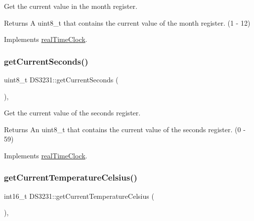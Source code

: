 Get the current value in the month register. 

\begin{DoxyReturn}{Returns}
A uint8\+\_\+t that contains the current value of the month register. (1 -\/ 12) 
\end{DoxyReturn}


Implements \mbox{\hyperlink{classreal_time_clock_a24dd15babb345129fd995641946c5f2b}{real\+Time\+Clock}}.

\mbox{\label{class_d_s3231_a8a5357eae07991d94f8f7610a3f3073a}} 
\subsubsection{\texorpdfstring{get\+Current\+Seconds()}{getCurrentSeconds()}}
{\footnotesize\ttfamily uint8\+\_\+t D\+S3231\+::get\+Current\+Seconds (\begin{DoxyParamCaption}{ }\end{DoxyParamCaption})\hspace{0.3cm}{\ttfamily [override]}, {\ttfamily [virtual]}}



Get the current value of the seconds register. 

\begin{DoxyReturn}{Returns}
An uint8\+\_\+t that contains the current value of the seconds register. (0 -\/ 59) 
\end{DoxyReturn}


Implements \mbox{\hyperlink{classreal_time_clock_a46bfe69dc650cc27e648ac7adb03afd0}{real\+Time\+Clock}}.

\mbox{\label{class_d_s3231_abd46c1cf5f5c78e3222c3677e70a1272}} 
\subsubsection{\texorpdfstring{get\+Current\+Temperature\+Celsius()}{getCurrentTemperatureCelsius()}}
{\footnotesize\ttfamily int16\+\_\+t D\+S3231\+::get\+Current\+Temperature\+Celsius (\begin{DoxyParamCaption}{ }\end{DoxyParamCaption})\hspace{0.3cm}{\ttfamily [override]}, {\ttfamily [virtual]}}



